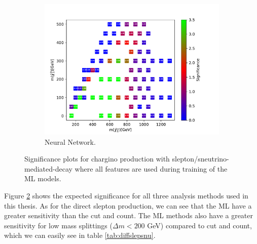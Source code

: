 \begin{figure}[H]
    \begin{subfigure}[t!]{0.49\textwidth}
    \includegraphics[width = \textwidth]{Figures/Significances/significance_NN_slepsnu_All_level.pdf}
    \caption{Neural Network.}
        \label{fig:signAllslepsnuNN}
    \end{subfigure}
    \caption{Significance plots for chargino production with slepton/sneutrino-mediated-decay where all features are used during training of the ML models.}
    \label{fig:signAllslepsnu}
\end{figure}

Figure \ref{fig:signAllslepsnu} shows the expected significance for all three analysis methods used in this thesis. As for the direct slepton production, we can see that the ML have a greater sensitivity than the cut and count. The ML methods also have a greater sensitivity for low mass splittings ($\Delta m < 200$ GeV) compared to cut and count, which we can easily see in table \ref{tab:diffslepsnu}.




